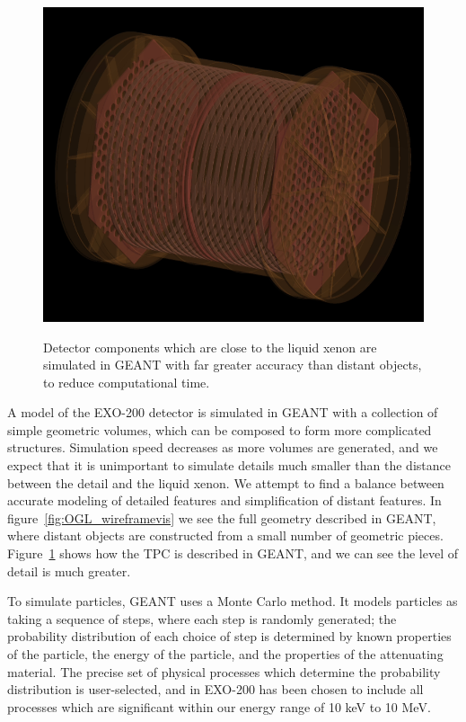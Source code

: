 \begin{figure}
\begin{center}
\includegraphics[keepaspectratio=true,width=\textwidth]{TPC_Cu_RayTracer.png}
\end{center}
\renewcommand{\baselinestretch}{1}
\small\normalsize
\begin{quote}
\caption{Detector components which are close to the liquid xenon are simulated in GEANT with far greater accuracy than distant objects, to reduce computational time.~\cite{MCDocumentRun2a}}
\label{fig:RayTracer_TPConly}
\end{quote}
\end{figure}
\renewcommand{\baselinestretch}{2}
\small\normalsize

A model of the EXO-200 detector is simulated in GEANT with a collection of simple geometric volumes, which can be composed to form more complicated structures.  Simulation speed decreases as more volumes are generated, and we expect that it is unimportant to simulate details much smaller than the distance between the detail and the liquid xenon.  We attempt to find a balance between accurate modeling of detailed features and simplification of distant features.  In figure~\ref{fig:OGL_wireframevis} we see the full geometry described in GEANT, where distant objects are constructed from a small number of geometric pieces.  Figure~\ref{fig:RayTracer_TPConly} shows how the TPC is described in GEANT, and we can see the level of detail is much greater.

To simulate particles, GEANT uses a Monte Carlo method.  It models particles as taking a sequence of steps, where each step is randomly generated; the probability distribution of each choice of step is determined by known properties of the particle, the energy of the particle, and the properties of the attenuating material.  The precise set of physical processes which determine the probability distribution is user-selected, and in EXO-200 has been chosen to include all processes which are significant within our energy range of 10 keV to 10 MeV.~\cite{MCDocumentRun2a}

